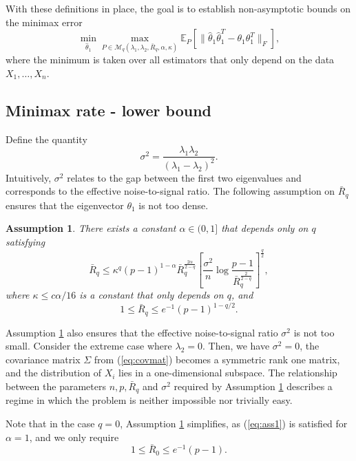 \documentclass[11pt]{article}
\newtheorem{assumption}[theorem]{Assumption}
\newcommand{\E}{\mathbb{E}}
\begin{document}
With these definitions in place, the goal is to establish non-asymptotic bounds on the minimax error
\begin{equation*}
\min_{\hat{\theta}_1}\max_{P\in \mathcal{M}_q(\lambda_1,\lambda_2, \bar R_q, \alpha, \kappa)} \E_P\left[\|\hat\theta_1\hat\theta_1^T - \theta_1\theta_1^T\|_F\right],
\end{equation*} 
where the minimum is taken over all estimators that only depend on the data $X_1,\dots,X_n$.

\subsection{Minimax rate - lower bound}
Define the quantity
\begin{equation*}
\sigma^2 = \frac{\lambda_1\lambda_2}{(\lambda_1 - \lambda_2)^2}.
\end{equation*}
Intuitively, $\sigma^2$ relates to the gap between the first two eigenvalues and corresponds to the effective noise-to-signal ratio. The following assumption on $\bar R_q$ ensures that the eigenvector $\theta_1$ is not too dense. 
\begin{assumption}\label{assumption}
There exists a constant $\alpha\in (0,1]$ that depends only on $q$ satisfying 
\begin{equation}\label{eq:ass1}
\bar R_q \le \kappa^q(p-1)^{1-\alpha} \bar R_q^{\frac{2\alpha}{2-q}}\left[\frac{\sigma^2}{n}\log \frac{p-1}{\bar R_q^{\frac{2}{2-q}}}\right]^{\frac{q}{2}},
\end{equation}
where $\kappa\le c\alpha/16$ is a constant that only depends on $q$, and 
\begin{equation}\label{eq:ass2}
1\le \bar R_q \le e^{-1}(p-1)^{1-q/2}.
\end{equation}
\end{assumption}
Assumption \ref{assumption} also ensures that the effective noise-to-signal ratio $\sigma^2$ is not too small. Consider the extreme case where $\lambda_2=0$. Then, we have $\sigma^2=0$, the covariance matrix $\Sigma$ from (\ref{eq:covmat}) becomes a symmetric rank one matrix, and the distribution of $X_i$ lies in a one-dimensional subspace. The relationship between the parameters $n, p, \bar R_q$ and $\sigma^2$ required by Assumption \ref{assumption} describes a regime in which the problem is neither impossible nor trivially easy.

Note that in the case $q=0$, Assumption \ref{assumption} simplifies, as (\ref{eq:ass1}) is satisfied for $\alpha=1$, and we only require 
\begin{equation*}
1\le \bar R_0 \le e^{-1}(p-1).
\end{equation*}
\end{document}
